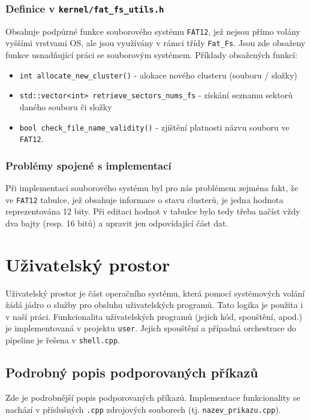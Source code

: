 \documentclass[12pt, a4paper]{article}
\let\oldsection\section
\renewcommand\section{\clearpage\oldsection}
\begin{document}
\subsubsection{Definice v \texttt{kernel/fat\_fs\_utils.h}}
Obsahuje podpůrné funkce souborového systému \texttt{FAT12}, jež nejsou přímo volány vyššími vrstvami OS, ale jsou využívány v rámci třídy \texttt{Fat\_Fs}. Jsou zde obsaženy funkce usnadňující práci se souborovým systémem. Příklady obsažených funkcí:
\begin{itemize}
    \item \texttt{int allocate\_new\_cluster()} - alokace nového clusteru (souboru / složky)
    \item \texttt{std::vector<int> retrieve\_sectors\_nums\_fs} - získání seznamu sektorů daného souboru či složky
    \item \texttt{bool check\_file\_name\_validity()} - zjištění platnosti názvu souboru ve \texttt{FAT12}.
\end{itemize}

\subsubsection{Problémy spojené s implementací}
Při implementaci souborového systému byl pro nás problémem zejména fakt, že ve \texttt{FAT12} tabulce, jež obsahuje informace o stavu clusterů, je jedna hodnota reprezentována 12 bity. Při editaci hodnot v tabulce bylo tedy třeba načíst vždy dva bajty (resp. 16 bitů) a upravit jen odpovídající část dat.

\section{Uživatelský prostor}
	Uživatelský prostor je část operačního systému, která pomocí systémových volání žádá jádro o služby pro obsluhu uživatelských programů. Tato logika je použita i v naší práci. Funkcionalita uživatelských programů (jejich kód, spouštění, apod.) je implementovaná v projektu \texttt{user}. Jejich spouštění a případná orchestrace do pipeline je řešena v \texttt{shell.cpp}.
	
	
	\subsection{Podrobný popis podporovaných příkazů} \label{subDetail}
	Zde je podrobnější popis podporovaných příkazů. Implementace funkcionality se nachází v příslušných \texttt{.cpp} zdrojových souborech (tj. \texttt{nazev\_prikazu.cpp}).    
    
\end{document}
